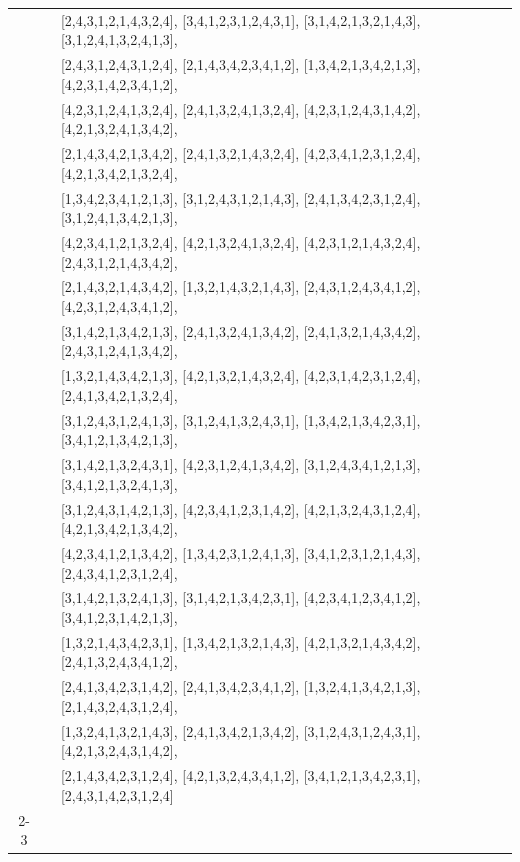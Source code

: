 \documentclass[10pt]{amsart}
\numberwithin{equation}{section}
\theoremstyle{plain}
\theoremstyle{definition}
\theoremstyle{remark}
\begin{document}
{\begin{longtable}{c|l|l}
		&  & [2,4,3,1,2,1,4,3,2,4], [3,4,1,2,3,1,2,4,3,1], [3,1,4,2,1,3,2,1,4,3], [3,1,2,4,1,3,2,4,1,3], \\
		&  & [2,4,3,1,2,4,3,1,2,4], [2,1,4,3,4,2,3,4,1,2], [1,3,4,2,1,3,4,2,1,3], [4,2,3,1,4,2,3,4,1,2], \\
		&  & [4,2,3,1,2,4,1,3,2,4], [2,4,1,3,2,4,1,3,2,4], [4,2,3,1,2,4,3,1,4,2], [4,2,1,3,2,4,1,3,4,2], \\
		&  & [2,1,4,3,4,2,1,3,4,2], [2,4,1,3,2,1,4,3,2,4], [4,2,3,4,1,2,3,1,2,4], [4,2,1,3,4,2,1,3,2,4], \\
		&  & [1,3,4,2,3,4,1,2,1,3], [3,1,2,4,3,1,2,1,4,3], [2,4,1,3,4,2,3,1,2,4], [3,1,2,4,1,3,4,2,1,3], \\
		&  & [4,2,3,4,1,2,1,3,2,4], [4,2,1,3,2,4,1,3,2,4], [4,2,3,1,2,1,4,3,2,4], [2,4,3,1,2,1,4,3,4,2], \\
		&  & [2,1,4,3,2,1,4,3,4,2], [1,3,2,1,4,3,2,1,4,3], [2,4,3,1,2,4,3,4,1,2], [4,2,3,1,2,4,3,4,1,2], \\
		&  & [3,1,4,2,1,3,4,2,1,3], [2,4,1,3,2,4,1,3,4,2], [2,4,1,3,2,1,4,3,4,2], [2,4,3,1,2,4,1,3,4,2], \\
		&  & [1,3,2,1,4,3,4,2,1,3], [4,2,1,3,2,1,4,3,2,4], [4,2,3,1,4,2,3,1,2,4], [2,4,1,3,4,2,1,3,2,4], \\
		&  & [3,1,2,4,3,1,2,4,1,3], [3,1,2,4,1,3,2,4,3,1], [1,3,4,2,1,3,4,2,3,1], [3,4,1,2,1,3,4,2,1,3], \\
		&  & [3,1,4,2,1,3,2,4,3,1], [4,2,3,1,2,4,1,3,4,2], [3,1,2,4,3,4,1,2,1,3], [3,4,1,2,1,3,2,4,1,3], \\
		&  & [3,1,2,4,3,1,4,2,1,3], [4,2,3,4,1,2,3,1,4,2], [4,2,1,3,2,4,3,1,2,4], [4,2,1,3,4,2,1,3,4,2], \\
		&  & [4,2,3,4,1,2,1,3,4,2], [1,3,4,2,3,1,2,4,1,3], [3,4,1,2,3,1,2,1,4,3], [2,4,3,4,1,2,3,1,2,4], \\
		&  & [3,1,4,2,1,3,2,4,1,3], [3,1,4,2,1,3,4,2,3,1], [4,2,3,4,1,2,3,4,1,2], [3,4,1,2,3,1,4,2,1,3], \\
		&  & [1,3,2,1,4,3,4,2,3,1], [1,3,4,2,1,3,2,1,4,3], [4,2,1,3,2,1,4,3,4,2], [2,4,1,3,2,4,3,4,1,2], \\
		&  & [2,4,1,3,4,2,3,1,4,2], [2,4,1,3,4,2,3,4,1,2], [1,3,2,4,1,3,4,2,1,3], [2,1,4,3,2,4,3,1,2,4], \\
		&  & [1,3,2,4,1,3,2,1,4,3], [2,4,1,3,4,2,1,3,4,2], [3,1,2,4,3,1,2,4,3,1], [4,2,1,3,2,4,3,1,4,2], \\
		&  & [2,1,4,3,4,2,3,1,2,4], [4,2,1,3,2,4,3,4,1,2], [3,4,1,2,1,3,4,2,3,1], [2,4,3,1,4,2,3,1,2,4] \\ \cline{2-3}
		

\end{longtable}}
\end{document}
